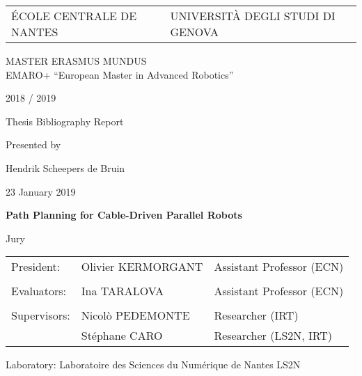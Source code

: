 \def\lskip{\vspace{0.5cm}}


\begin{tabular}{p{7cm}p{8cm}}
	ÉCOLE CENTRALE DE NANTES & UNIVERSITÀ DEGLI STUDI DI GENOVA
\end{tabular}

\vspace{2cm}

\begin{center}
	\large\sc MASTER ERASMUS MUNDUS \\ 
	\normalsize{EMARO+ ``European Master in Advanced Robotics''}
\end{center}

\begin{center}
	2018 / 2019
	\lskip%

	Thesis Bibliography Report
	\lskip%

	Presented by
	\lskip%

	Hendrik Scheepers de Bruin
	\lskip%

	23 January 2019
	\lskip\lskip%

	{\Large \textbf{Path Planning for Cable-Driven Parallel Robots}}

\end{center}

\vfill

\begin{center}
	Jury
\end{center}

\begin{tabular}{p{} p{} p{}}
	President:		& Olivier KERMORGANT	& Assistant Professor (ECN) \\
	\\
	Evaluators:		& Ina TARALOVA			& Assistant Professor (ECN) \\
	\\
	Supervisors:	& Nicolò PEDEMONTE		& Researcher (IRT) \\
					& Stéphane CARO			& Researcher (LS2N, IRT) \\
\end{tabular}

\lskip%

Laboratory: Laboratoire des Sciences du Numérique de Nantes LS2N
